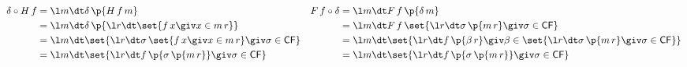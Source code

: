 \documentclass{article}
\begin{document}
\begin{align*}
\delta \circ H\,f
&=
\l m\dt \delta\,\p{H\,f\,m}
&
F\,f \circ \delta
&=
\l m\dt F\,f\,\p{\delta\,m}
%
\\
%
&= \l m\dt \delta\,\p{\l r\dt \set{f\,x \giv x\in m\,r}}
&
&= \l m\dt F\,f\,\set{\l r\dt \sigma\,\p{m\,r} \giv \sigma \in \textsf{CF}}
%
\\
%
&= \l m\dt \set{\l r\dt \sigma\,\set{f\,x \giv x \in m\,r} \giv \sigma\in \textsf{CF}}
&
&= \l m\dt \set{\l r\dt f\,\p{\beta\,r} \giv \beta \in \set{\l r\dt \sigma\,\p{m\,r} \giv \sigma \in \textsf{CF}}}
%
\\
%
&= \l m\dt \set{\l r\dt f\,\p{\sigma\,\p{m\,r}} \giv \sigma\in \textsf{CF}}
&
&= \l m\dt \set{\l r\dt f\,\p{\sigma\,\p{m\,r}} \giv \sigma\in \textsf{CF}}
\end{align*}
\end{document}

